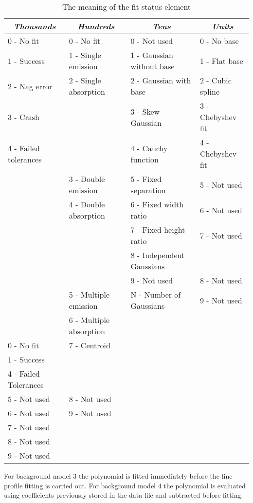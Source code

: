 \begin{table}[ht]
\small
\begin{center}
\begin{tabular}{|l|l|l|l|} \hline
\multicolumn{1}{|c|}{\em Thousands} &
\multicolumn{1}{c|}{\em Hundreds} &
\multicolumn{1}{c|}{\em Tens} &
\multicolumn{1}{c|}{\em Units} \\ \hline
0 - No fit & 0 - No fit & 0 - Not used & 0 - No base \\ \cline{2-3}
1 - Success & 1 - Single emission & 1 - Gaussian without base
 & 1 - Flat base \\
2 - Nag error & 2 - Single absorption & 2 - Gaussian with base
 & 2 - Cubic spline \\
3 - Crash & & 3 - Skew Gaussian & 3 - Chebyshev fit \\
4 - Failed tolerances & & 4 - Cauchy function & 4 - Chebyshev fit \\ 
\cline{2-3}
 & 3 - Double emission & 5 - Fixed separation & 5 - Not used \\
 & 4 - Double absorption & 6 - Fixed width ratio & 6 - Not used \\
 & & 7 - Fixed height ratio & 7 - Not used \\
 & & 8 - Independent Gaussians & \\
 & & 9 - Not used & 8 - Not used \\ \cline{2-3}
 & 5 - Multiple emission & N - Number of Gaussians & 9 - Not used \\
 & 6 - Multiple absorption & & \\ \cline{1-3}
0 - No fit & 7 - Centroid & & \\
1 - Success & & & \\
4 - Failed Tolerances & & & \\ \cline{1-3}
5 - Not used & 8 - Not used & & \\
6 - Not used & 9 - Not used & & \\
7 - Not used & & & \\
8 - Not used & & & \\
9 - Not used & & & \\ \hline
\end{tabular}
\caption[a]{The meaning of the fit status element}
\label{tb.fitstatus}
\end{center}

For background model 3 the polynomial is fitted immediately before the
line profile fitting is carried out.
For background model 4 the polynomial is evaluated using coefficients
previously stored in the data file and subtracted before fitting.
\end{table}

